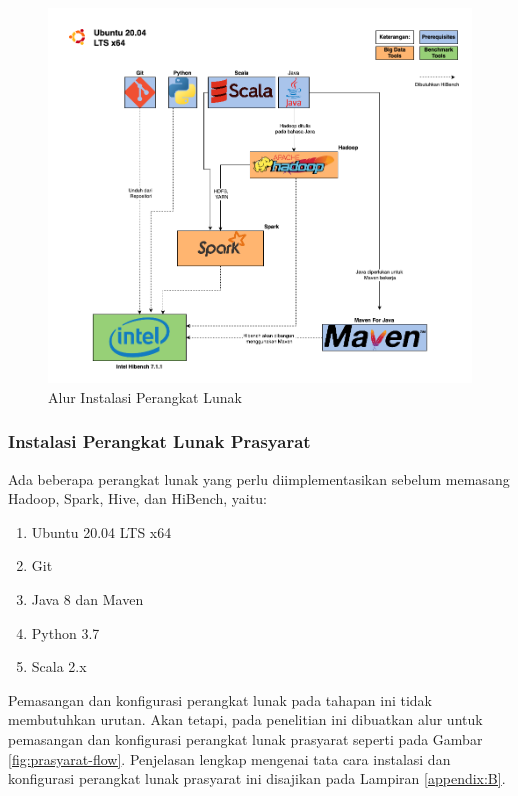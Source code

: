 \begin{figure}[h]
    \centering
    \includegraphics[width=1\textwidth]{figures/ch03/alurkerja-soft.png}
    \caption{Alur Instalasi Perangkat Lunak}
    \label{fig:alurkerja-soft}
\end{figure}

\subsubsection{Instalasi Perangkat Lunak Prasyarat}
Ada beberapa perangkat lunak yang perlu diimplementasikan sebelum memasang Hadoop, Spark, Hive, dan HiBench, yaitu:
\begin{enumerate}
	\item Ubuntu 20.04 LTS x64
	\item Git
	\item Java 8 dan Maven
	\item Python 3.7
	\item Scala 2.x
\end{enumerate}

Pemasangan dan konfigurasi perangkat lunak pada tahapan ini tidak membutuhkan urutan. Akan tetapi, pada penelitian ini dibuatkan alur untuk pemasangan dan konfigurasi perangkat lunak prasyarat seperti pada Gambar \ref{fig:prasyarat-flow}. Penjelasan lengkap mengenai tata cara instalasi dan konfigurasi perangkat lunak prasyarat ini disajikan pada Lampiran \ref{appendix:B}. 

